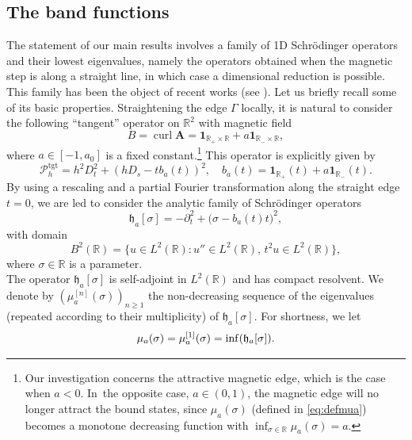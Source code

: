 \documentclass[10pt]{amsart}
\let\sep:
\DeclareMathOperator{\curl}{curl}
\let\sp\relax
\DeclareMathOperator{\sp}{sp}
\newcommand{\cP}{\mathcal{P}}
\theoremstyle{plain}
\theoremstyle{definition}
\newcommand{\A}{\boldsymbol{A}}
\newcommand{\R}{\mathbb{R}}
\begin{document}
\subsection{The band functions}
The statement of our main results involves a family of 1D Schrödinger operators and their lowest eigenvalues, namely
the operators obtained when the magnetic step is along a straight line, in which case a dimensional reduction is possible.
This family has been the object of recent works (see \cite{AK20, HPRS16}). Let us briefly recall some of its basic properties.
Straightening the edge $\Gamma$ locally, it is natural to consider the following \enquote{tangent} operator on $\R^2$ with magnetic field
\[
B=\curl\A=\mathbf 1_{\mathbb R_+\times\mathbb R }+a\mathbf 1_{\mathbb R_-\times\mathbb R},
\]
where $ a\in[-1,a_0]$ is a fixed constant.\footnote{Our investigation concerns the attractive magnetic edge, which is the case when $a<0$. In~the opposite case, $a \in (0,1)$, the magnetic edge will no longer attract the bound states, since $\mu_a(\sigma)$ (defined in \eqref{eq:defmua}) becomes a monotone decreasing function with $\inf_{\sigma \in{\mathbb R}} \mu_a(\sigma) = a$.} This operator is explicitly given by
\begin{equation}\label{eq.Ptgt}
\cP^{\mathrm{tgt}}_h=h^2D_t^2+(hD_s-tb_a(t))^2,\quad b_a(t)=\mathbf{1}_{\mathbb R_+}(t)+a\mathbf{1}_{\mathbb R_-}(t).
\end{equation}
By using a rescaling and a partial Fourier transformation along the straight edge $t=0$, we are led to consider the analytic family of Schrödinger operators
\begin{equation}\label{eq:ha}
\mathfrak h_a[\sigma]=-\partial^2_t+\bigl(\sigma-b_a(t)t\bigr)^2,
\end{equation}
with domain
\begin{equation}\label{eq:b2}
B^2(\R)=\{u\in L^2(\R) \sep u''\in L^2(\R),\,t^2u\in L^2(\R)\},
\end{equation}
where $\sigma\in\mathbb R$ is a parameter. \\
The operator $\mathfrak h_a[\sigma]$ is self-adjoint in $L^2(\R)$ and has compact resolvent. We denote by $(\mu^{[n]}_{a}(\sigma))_{n\geq 1}$ the non-decreasing sequence of the eigenvalues (repeated according to their multiplicity) of $\mathfrak h_a[\sigma]$. For shortness, we let
\begin{align}\label{eq:defmua}
\mu_a(\sigma)=\mu^{[1]}_{a}(\sigma) = \inf \sp(\mathfrak h_a[\sigma]).
\end{align}
\end{document}

